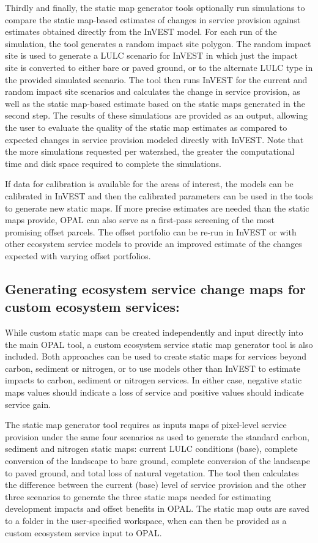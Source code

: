 \documentclass[11pt,letterpaper]{report}
\begin{document}
	Thirdly and finally, the static map generator tools optionally run simulations to compare the static map-based estimates of changes in service provision against estimates obtained directly from the InVEST model. For each run of the simulation, the tool generates a random impact site polygon. The random impact site is used to generate a LULC scenario for InVEST in which just the impact site is converted to either bare or paved ground, or to the alternate LULC type in the provided simulated scenario. The tool then runs InVEST for the current and random impact site scenarios and calculates the change in service provision, as well as the static map-based estimate based on the static maps generated in the second step. The results of these simulations are provided as an output, allowing the user to evaluate the quality of the static map estimates as compared to expected changes in service provision modeled directly with InVEST. Note that the more simulations requested per watershed, the greater the computational time and disk space required to complete the simulations. 
		
	If data for calibration is available for the areas of interest, the models can be calibrated in InVEST and then the calibrated parameters can be used in the tools to generate new static maps. If more precise estimates are needed than the static maps provide, OPAL can also serve as a first-pass screening of the most promising offset parcels. The offset portfolio can be re-run in InVEST or with other ecosystem service models to provide an improved estimate of the changes expected with varying offset portfolios. 
	
	\subsection*{Generating ecosystem service change maps for custom ecosystem services:}
	
	While custom static maps can be created independently and input directly into the main OPAL tool, a custom ecosystem service static map generator tool is also included. Both approaches can be used to create static maps for services beyond carbon, sediment or nitrogen, or to use models other than InVEST to estimate impacts to carbon, sediment or nitrogen services.  In either case, negative static maps values should indicate a loss of service and positive values should indicate service gain.
	
	The static map generator tool requires as inputs maps of pixel-level service provision under the same four scenarios as used to generate the standard carbon, sediment and nitrogen static maps: current LULC conditions (base), complete conversion of the landscape to bare ground, complete conversion of the landscape to paved ground, and total loss of natural vegetation. The tool then calculates the difference between the current (base) level of service provision and the other three scenarios to generate the three static maps needed for estimating development impacts and offset benefits in OPAL. The static map outs are saved to a folder in the user-specified workspace, when can then be provided as a custom ecosystem service input to OPAL.
	
\end{document}
